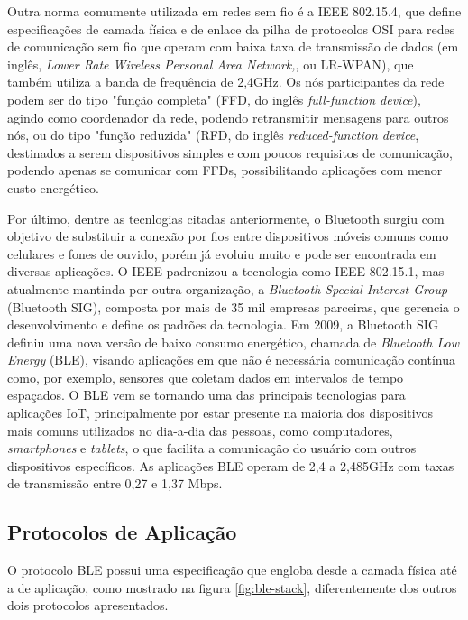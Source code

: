 \documentclass[../monografia.tex]{subfiles}
\begin{document}
Outra norma comumente utilizada em redes sem fio é a IEEE 802.15.4, que define especificações de camada física e de enlace da pilha de protocolos OSI para redes de comunicação sem fio que operam com baixa taxa de transmissão de dados (em inglês, \textit{Lower Rate Wireless Personal Area Network,}, ou LR-WPAN), que também utiliza a banda de frequência de 2,4GHz\cite{802.15.4}. Os nós participantes da rede podem ser do tipo "função completa" (FFD, do inglês \textit{full-function device}), agindo como coordenador da rede, podendo retransmitir mensagens para outros nós, ou do tipo "função reduzida" (RFD, do inglês \textit{reduced-function device}, destinados a serem dispositivos simples e com poucos requisitos de comunicação, podendo apenas se comunicar com FFDs, possibilitando aplicações com menor custo energético. 

Por último, dentre as tecnlogias citadas anteriormente, o Bluetooth surgiu com objetivo de substituir a conexão por fios entre dispositivos móveis comuns como celulares e fones de ouvido, porém já evoluiu muito e pode ser encontrada em diversas aplicações. O IEEE padronizou a tecnologia como IEEE 802.15.1, mas atualmente mantinda por outra organização, a \textit{Bluetooth Special Interest Group} (Bluetooth SIG), composta por mais de 35 mil empresas parceiras, que gerencia o desenvolvimento e define os padrões da tecnologia. Em 2009, a Bluetooth SIG definiu uma nova versão de baixo consumo energético, chamada de \textit{Bluetooth Low Energy} (BLE), visando aplicações em que não é necessária comunicação contínua como, por exemplo, sensores que coletam dados em intervalos de tempo espaçados. O BLE vem se tornando uma das principais tecnologias para aplicações IoT, principalmente por estar presente na maioria dos dispositivos mais comuns utilizados no dia-a-dia das pessoas, como computadores, \textit{smartphones} e \textit{tablets}, o que facilita a comunicação do usuário com outros dispositivos específicos. As aplicações BLE operam de 2,4 a 2,485GHz com taxas de transmissão entre 0,27 e 1,37 Mbps\cite{ble-datarate}. 

\subsection{Protocolos de Aplicação} \label{protocolos-aplicacao}

O protocolo BLE possui uma especificação que engloba desde a camada física até a de aplicação, como mostrado na figura \ref{fig:ble-stack}, diferentemente dos outros dois protocolos apresentados. 
\end{document}
